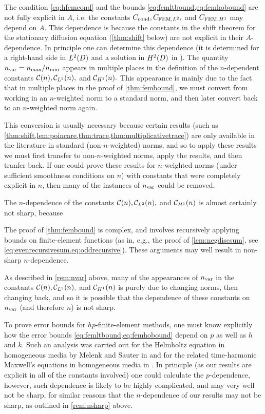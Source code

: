 \label{rem:explicita}
The condition \cref{eq:hfemcond} and the bounds \cref{eq:femltbound,eq:femhobound} are not fully explicit in $A$, i.e. the constants $C_{\mathrm{cond}}, C_{\mathrm{FEM},L^{2}},$ and $C_{\mathrm{FEM},H^{1}}$ may depend on $A$. This dependence is because the constants in the shift theorem for the stationary diffusion equation (\cref{thm:shift} below) are not explicit in their $A$-dependence. In principle one can determine this dependence (it is determined for a right-hand side in $\LtD$ and a solution in $\HtD$ in \cite[Appendix A]{ChScTe:13}).
\ere
{}\label{rem:nvar}
The quantity $n_{\mathrm{var}} = n_{\max}/n_{\min}$ appears in multiple places in the definition of the $n$-dependent constants $\mathcal C(n), \mathcal C_{L^{2}}(n),$ and $\mathcal C_{H^{1}}(n).$ This appearance is mainly due to the fact that in multiple places in the proof of \cref{thm:fembound}, we must convert from working in an $n$-weighted norm to a standard norm, and then later convert back to an $n$-weighted norm again.

This conversion is usually necessary because certain results (such as \cref{thm:shift,lem:poincare,thm:trace,thm:multiplicativetrace}) are only available in the literature in standard (non-$n$-weighted) norms, and so to apply these results we must first transfer to non-$n$-weighted norms, apply the results, and then tranfer back. If one could prove these results for $n$-weighted norms (under sufficient smoothness conditions on $n$) with constants that were completely explicit in $n$, then many of the instances of $n_{\mathrm{var}}$ could be removed.
\ere

\label{rem:nsharp}
The $n$-dependence of the constants $\mathcal C(n), \mathcal C_{L^{2}}(n),$ and $\mathcal C_{H^{1}}(n)$ is almost certainly not sharp, because
\ben
\item The proof of \cref{thm:fembound} is complex, and involves recursively applying bounds on finite-element functions (as in, e.g., the proof of \cref{lem:negdiscsum}, see \cref{eq:evenrecursivesum,eq:oddrecursive}). These arguments may well result in non-sharp $n$-dependence.
  \item As described in \cref{rem:nvar} above, many of the appearances of $n_{\mathrm{var}}$ in the constants $\mathcal C(n), \mathcal C_{L^{2}}(n),$ and $\mathcal C_{H^{1}}(n)$ is purely due to changing norms, then changing back, and so it is possible that the dependence of these constants on $n_{\mathrm{var}}$ (and therefore $n$) is not sharp.
\een
\ere

\bre[$p$-dependence]
To prove error bounds for $hp$-finite-element methods, one must know explicitly how the error bounds \cref{eq:femltbound,eq:femhobound} depend on $p$ as well as $h$ and $k$. Such an analysis was carried out for the Helmholtz equation in homogeneous media by Melenk and Sauter in \cite{MeSa:10,MeSa:11} and for the related time-harmonic Maxwell's equations in homogeneous media in \cite{MeSa:18}. In principle (as our results are explicit in all of the constants involved) one could calculate the $p$-dependence, however, such dependence is likely to be highly complicated, and may very well not be sharp, for similar reasons that the $n$-dependence of our results may not be sharp, as outlined in \cref{rem:nsharp} above.
\ere

